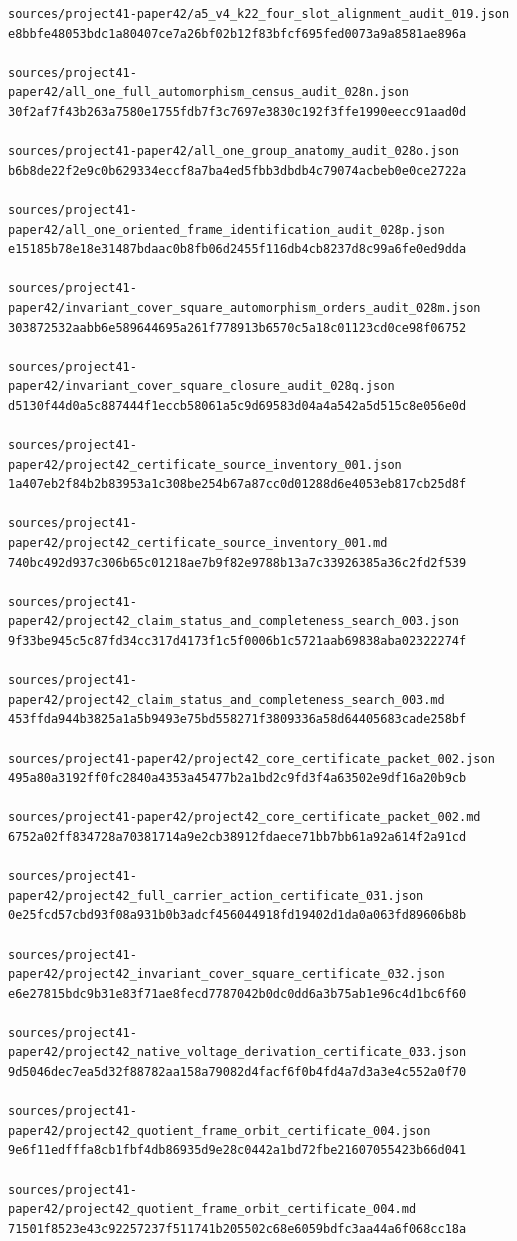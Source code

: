 \begin{verbatim}
sources/project41-paper42/a5_v4_k22_four_slot_alignment_audit_019.json
e8bbfe48053bdc1a80407ce7a26bf02b12f83bfcf695fed0073a9a8581ae896a

sources/project41-paper42/all_one_full_automorphism_census_audit_028n.json
30f2af7f43b263a7580e1755fdb7f3c7697e3830c192f3ffe1990eecc91aad0d

sources/project41-paper42/all_one_group_anatomy_audit_028o.json
b6b8de22f2e9c0b629334eccf8a7ba4ed5fbb3dbdb4c79074acbeb0e0ce2722a

sources/project41-paper42/all_one_oriented_frame_identification_audit_028p.json
e15185b78e18e31487bdaac0b8fb06d2455f116db4cb8237d8c99a6fe0ed9dda

sources/project41-paper42/invariant_cover_square_automorphism_orders_audit_028m.json
303872532aabb6e589644695a261f778913b6570c5a18c01123cd0ce98f06752

sources/project41-paper42/invariant_cover_square_closure_audit_028q.json
d5130f44d0a5c887444f1eccb58061a5c9d69583d04a4a542a5d515c8e056e0d

sources/project41-paper42/project42_certificate_source_inventory_001.json
1a407eb2f84b2b83953a1c308be254b67a87cc0d01288d6e4053eb817cb25d8f

sources/project41-paper42/project42_certificate_source_inventory_001.md
740bc492d937c306b65c01218ae7b9f82e9788b13a7c33926385a36c2fd2f539

sources/project41-paper42/project42_claim_status_and_completeness_search_003.json
9f33be945c5c87fd34cc317d4173f1c5f0006b1c5721aab69838aba02322274f

sources/project41-paper42/project42_claim_status_and_completeness_search_003.md
453ffda944b3825a1a5b9493e75bd558271f3809336a58d64405683cade258bf

sources/project41-paper42/project42_core_certificate_packet_002.json
495a80a3192ff0fc2840a4353a45477b2a1bd2c9fd3f4a63502e9df16a20b9cb

sources/project41-paper42/project42_core_certificate_packet_002.md
6752a02ff834728a70381714a9e2cb38912fdaece71bb7bb61a92a614f2a91cd

sources/project41-paper42/project42_full_carrier_action_certificate_031.json
0e25fcd57cbd93f08a931b0b3adcf456044918fd19402d1da0a063fd89606b8b

sources/project41-paper42/project42_invariant_cover_square_certificate_032.json
e6e27815bdc9b31e83f71ae8fecd7787042b0dc0dd6a3b75ab1e96c4d1bc6f60

sources/project41-paper42/project42_native_voltage_derivation_certificate_033.json
9d5046dec7ea5d32f88782aa158a79082d4facf6f0b4fd4a7d3a3e4c552a0f70

sources/project41-paper42/project42_quotient_frame_orbit_certificate_004.json
9e6f11edfffa8cb1fbf4db86935d9e28c0442a1bd72fbe21607055423b66d041

sources/project41-paper42/project42_quotient_frame_orbit_certificate_004.md
71501f8523e43c92257237f511741b205502c68e6059bdfc3aa44a6f068cc18a
\end{verbatim}

